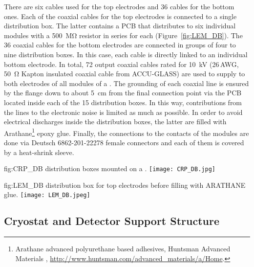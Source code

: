 There are six cables used for the  top electrodes and \num{36} cables for the bottom ones. Each of the coaxial cables for the  top electrodes is connected to a single distribution box. The latter contains a PCB that %
distributes  to six individual  modules with a \SI{500}{\mega\ohm} resistor in series for each 
 (Figure~\ref{fig:LEM_DB}). The \num{36} coaxial cables for the  bottom electrodes are connected in groups of four to nine distribution boxes. In this case, each  cable is directly linked to an individual  bottom electrode. In total, \num{72} output coaxial cables rated for \SI{10}{kV} (\num{26}\,AWG, \SI{50}{\ohm} Kapton insulated coaxial cable from ACCU-GLASS) are used to supply  to both electrodes of all  modules of a . The grounding of each coaxial line is ensured by the \fdth flange down to about \SI{5}{cm} from the  final connection point via the PCB located inside each of the \num{15} distribution boxes. In this way, contributions from the  lines to the electronic noise is limited as much as possible. In order to avoid electrical discharges inside the distribution boxes, the latter are filled with Arathane\footnote{Arathane\texttrademark{} advanced polyurethane based adhesives, Huntsman Advanced Materials , \url{http://www.huntsman.com/advanced\_materials/a/Home}.} epoxy glue. Finally, the connections to the  contacts of the  modules are done via  Deutsch 6862-201-22278 female connectors and each of them is covered by a heat-shrink sleeve. 

\begin{dunefigure}
{fig:CRP_DB} 
{  distribution boxes mounted on a . }
  \texttt{[image: CRP\_DB.jpg]}
\end{dunefigure}


\begin{dunefigure}
{fig:LEM_DB} 
{ distribution box for  top electrodes before filling with ARATHANE glue. }
  \texttt{[image: LEM\_DB.jpeg]}
\end{dunefigure}


\subsection{Cryostat and Detector Support Structure}
\label{sec:fddp-crp-intfc-support}

